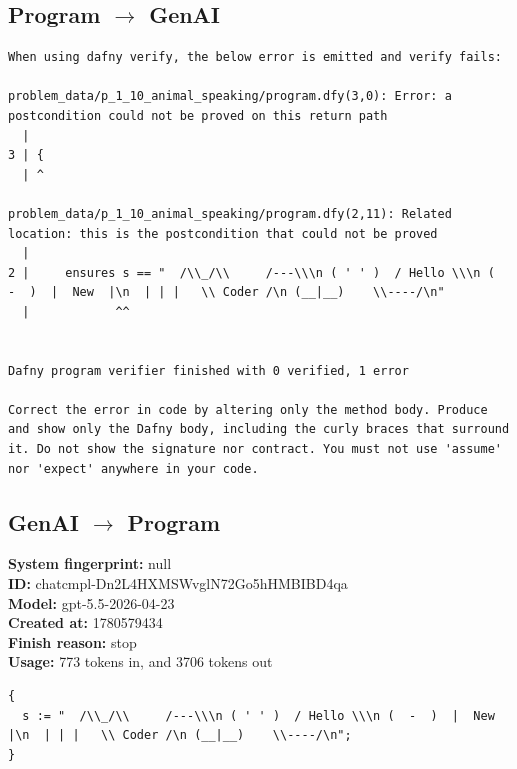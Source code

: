 \documentclass{article}
\begin{document}
\subsection*{Program $\rightarrow$ GenAI}
\begin{lstlisting}
When using dafny verify, the below error is emitted and verify fails:

problem_data/p_1_10_animal_speaking/program.dfy(3,0): Error: a postcondition could not be proved on this return path
  |
3 | {
  | ^

problem_data/p_1_10_animal_speaking/program.dfy(2,11): Related location: this is the postcondition that could not be proved
  |
2 | 	ensures s == "  /\\_/\\     /---\\\n ( ' ' )  / Hello \\\n (  -  )  |  New  |\n  | | |   \\ Coder /\n (__|__)    \\----/\n"
  |            ^^


Dafny program verifier finished with 0 verified, 1 error

Correct the error in code by altering only the method body. Produce and show only the Dafny body, including the curly braces that surround it. Do not show the signature nor contract. You must not use 'assume' nor 'expect' anywhere in your code.
\end{lstlisting}
\subsection*{GenAI $\rightarrow$ Program}
\textbf{System fingerprint: }null
\\\textbf{ID: }chatcmpl-Dn2L4HXMSWvglN72Go5hHMBIBD4qa
\\\textbf{Model: }gpt-5.5-2026-04-23
\\\textbf{Created at: }1780579434
\\\textbf{Finish reason: }stop
\\\textbf{Usage: }773 tokens in, and 3706 tokens out
\begin{lstlisting}
{
  s := "  /\\_/\\     /---\\\n ( ' ' )  / Hello \\\n (  -  )  |  New  |\n  | | |   \\ Coder /\n (__|__)    \\----/\n";
}
\end{lstlisting}
\end{document}
